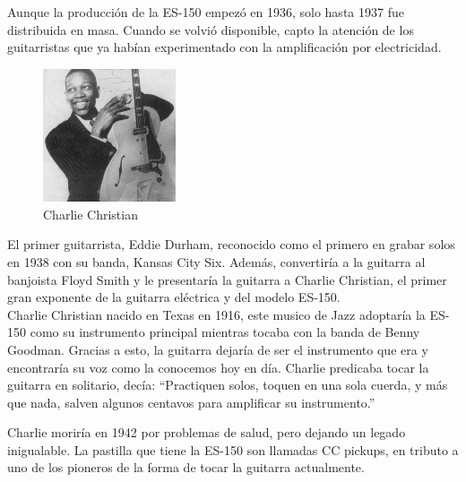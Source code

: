 \documentclass{article}
\begin{document}
Aunque la producción de la ES-150 empezó en 1936, solo hasta 1937 fue distribuida en masa. Cuando se volvió disponible, capto la atención de los guitarristas que ya habían experimentado con la amplificación por electricidad.\\

\begingroup
\setlength{\intextsep}{0pt}%
\setlength{\columnsep}{0pt}%

\begin{figure}
    \centering
    \includegraphics[width=0.35\textwidth]{images/cc.jpg}
    \vspace{-5pt}
    \caption{Charlie Christian}
\end{figure}

El primer guitarrista, Eddie Durham, reconocido como el primero en grabar solos en 1938 con su banda, Kansas City Six. Además, convertiría a la guitarra al banjoista Floyd Smith y le presentaría la guitarra a Charlie Christian, el primer gran exponente de la guitarra eléctrica y del modelo ES-150.\\

Charlie Christian nacido en Texas en 1916, este musico de Jazz adoptaría la ES-150 como su instrumento principal mientras tocaba con la banda de Benny Goodman. Gracias a esto, la guitarra dejaría de ser el instrumento que era y encontraría su voz como la conocemos hoy en día. Charlie predicaba tocar la guitarra en solitario, decía: “Practiquen solos, toquen en una sola cuerda, y más que nada, salven algunos centavos para amplificar su instrumento.”\\

\endgroup

Charlie moriría en 1942 por problemas de salud, pero dejando un legado inigualable. La pastilla que tiene la ES-150 son llamadas CC pickups, en tributo a uno de los pioneros de la forma de tocar la guitarra actualmente.\\

\begingroup
\setlength{\intextsep}{0pt}%
\setlength{\columnsep}{0pt}%
\end{document}
